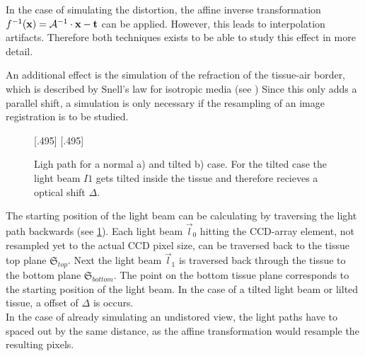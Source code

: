 In the case of simulating the distortion, the affine inverse transformation $f^{-1}(\mathbf{x}) = \mathcal{A}^{-1} \cdot \mathbf{x} - \mathbf{t}$ can be applied.
However, this leads to interpolation artifacts.
Therefore both techniques exists to be able to study this effect in more detail.
\par
% 
An additional effect is the simulation of the refraction of the tissue-air border, which is described by Snell's law for isotropic media (see \dummy{})
Since this only adds a parallel shift, a simulation is only necessary if the resampling of an image registration is to be studied.
\par
% 
\begin{figure}[!t]
\setlength{\tikzwidth}{0.42\textwidth}
[.495\textwidth]{
\def\tilt{0}
\def\nindex{2.25}
}\hfill
{}[.495\textwidth]{
}
\caption[Light path]{Ligh path for a normal a) and tilted b) case. For the tilted case the light beam $I1$  gets tilted inside the tissue and therefore recieves a optical shift $\Delta$.}
\label{fig:tilted_side_view}
\end{figure}
% 
The starting position of the light beam can be calculating by traversing the light path backwards (see \cref{fig:tilted_side_view}).
Each light beam $\vec{l}_0$ hitting the \ac{CCD}-array element, not resampled yet to the actual \ac{CCD} pixel size, can be traversed back to the tissue top plane $\mathfrak{S}_{top}$.
Next the light beam $\vec{l}_1$ is traversed back through the tissue to the bottom plane $\mathfrak{S}_{bottom}$.
The point on the bottom tissue plane corresponds to the starting position of the light beam.
In the case of a tilted light beam or lilted tissue, a offset of $\Delta$ is occurs.
\\
% 
In the case of already simulating an undistored view, the light paths have to spaced out by the same distance, as the affine transformation would resample the resulting pixels.
% 
\begin{lstfloat}[!p]
	
	\caption{Pseudocode simulation }
	\label{alg:simulation}
\end{lstfloat}
% 
